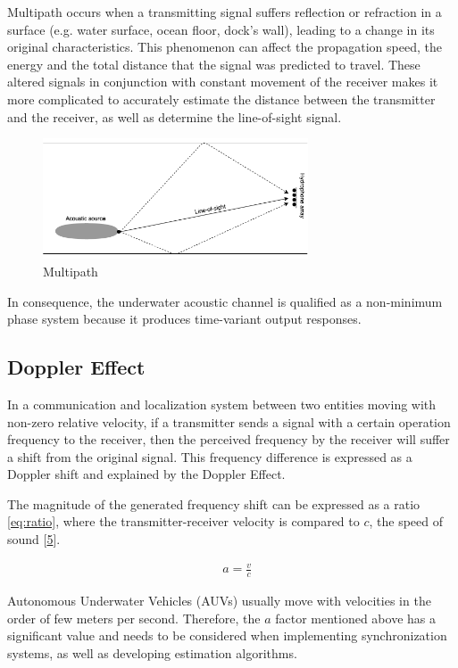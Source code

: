 Multipath occurs when a transmitting signal suffers reflection or refraction in a surface (e.g. water surface, ocean floor, dock's wall), leading to a change in its original characteristics. This phenomenon can affect the propagation speed, the energy and the total distance that the signal was predicted to travel. These altered signals in conjunction with constant movement of the receiver makes it more complicated to accurately estimate the distance between the transmitter and the receiver, as well as determine the line-of-sight signal. 

\begin{figure}[!htbp]
	\centering
	\includegraphics[width=0.7\textwidth]{figures/multipath}
	\caption{Multipath}
	\label{fig:mpath}
\end{figure}

In consequence, the underwater acoustic channel is qualified as a non-minimum phase system because it produces time-variant output responses.

\subsection{Doppler Effect} \label{subsec:doppler}

In a communication and localization system between two entities moving with non-zero relative velocity, if a transmitter sends a signal with a certain operation frequency to the receiver, then the perceived frequency by the receiver will suffer a shift from the original signal. This frequency difference is expressed as a Doppler shift and explained by the Doppler Effect.

The magnitude of the generated frequency shift can be expressed as a ratio \ref{eq:ratio}, where the transmitter-receiver velocity is compared to \(c\), the speed of sound [\hyperref[r:commchan]{5}].

\begin{eqnarray}
&a = \frac{v}{c}
\label{eq:ratio}
\end{eqnarray}

Autonomous Underwater Vehicles (AUVs) usually move with velocities in the order of few meters per second. Therefore, the \(a\) factor mentioned above has a significant value and needs to be considered when implementing synchronization systems, as well as developing estimation algorithms.

